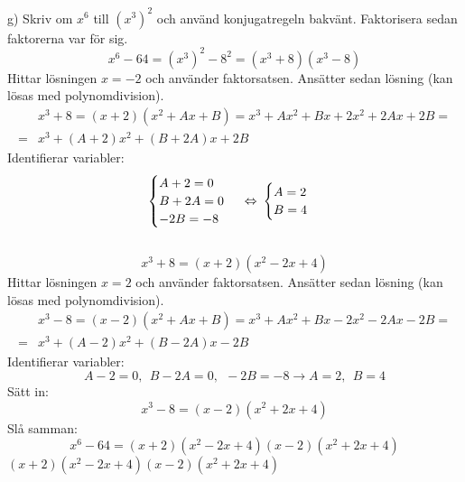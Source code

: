 \pagebreak
\begin{task}{g)}
	Skriv om $x^6$ till $(x^3)^2$ och använd konjugatregeln bakvänt. Faktorisera sedan faktorerna var för sig.
	\[x^6-64=(x^3)^2-8^2=(x^3+8)(x^3-8)\]
	Hittar lösningen $x=-2$ och använder faktorsatsen. Ansätter sedan lösning (kan lösas med polynomdivision).
	\begin{align*}
	&x^3+8=(x+2)(x^2+Ax+B)=x^3+Ax^2+Bx+2x^2+2Ax+2B= \\ =
	&x^3+(A+2)x^2+(B+2A)x+2B
	\end{align*}
	Identifierar variabler:
	\[\begin{cases}
	A+2=0 \\
	B+2A=0 \\
	-2B=-8
	\end{cases}
	\lra
	\begin{cases}
	A=2 \\
	B=4
	\end{cases}\] \\
	\[x^3+8=(x+2)(x^2-2x+4)\]
	Hittar lösningen $x=2$ och använder faktorsatsen. Ansätter sedan lösning (kan lösas med polynomdivision).
	\begin{align*}
	&x^3-8=(x-2)(x^2+Ax+B)=x^3+Ax^2+Bx-2x^2-2Ax-2B= \\ =
	&x^3+(A-2)x^2+(B-2A)x-2B
	\end{align*}
	Identifierar variabler:
	\[A-2=0,~~B-2A=0,~~-2B=-8 \rightarrow A=2,~~B=4\]
	Sätt in:
	\[x^3-8=(x-2)(x^2+2x+4)\]
	Slå samman:
	\[x^6-64=(x+2)(x^2-2x+4)(x-2)(x^2+2x+4)\]
	\ans $(x+2)(x^2-2x+4)(x-2)(x^2+2x+4)$
\end{task}

